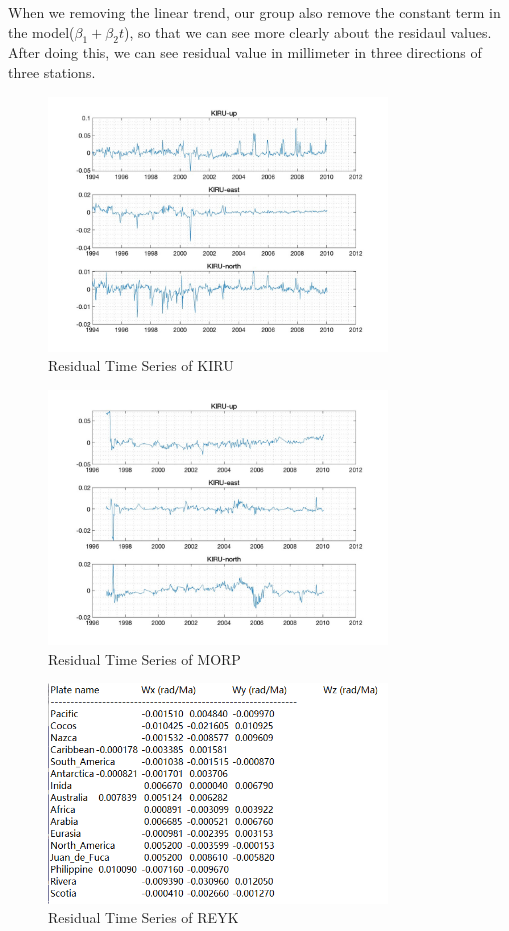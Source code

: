 \documentclass{article}
\begin{document}
When we removing the linear trend, our group also remove the constant term in the model($\beta_1 + \beta_2 t$), 
so that we can see more clearly about the residaul values.
After doing this, we can see residual value in millimeter in three directions of three stations.
\begin{figure}[H]
  \centering
  \includegraphics[width=9cm]{../result/KIRU/KIRU_2.jpg}
  \captionsetup{skip=0.2cm}
  \caption{Residual Time Series of KIRU}
  \label{fig:Res_KIRU}
\end{figure}
\begin{figure}[H]
  \centering
  \includegraphics[width=9cm]{../result/MORP/MORP_2.jpg}
  \caption{Residual Time Series of MORP}
  \label{fig:Res_MORP}
\end{figure}
\begin{figure}[H]
  \centering
  \includegraphics[width=9cm]{../source/nuvel.png}
  \caption{Residual Time Series of REYK}
  \label{fig:Res_REYK}
\end{figure}
\end{document}
